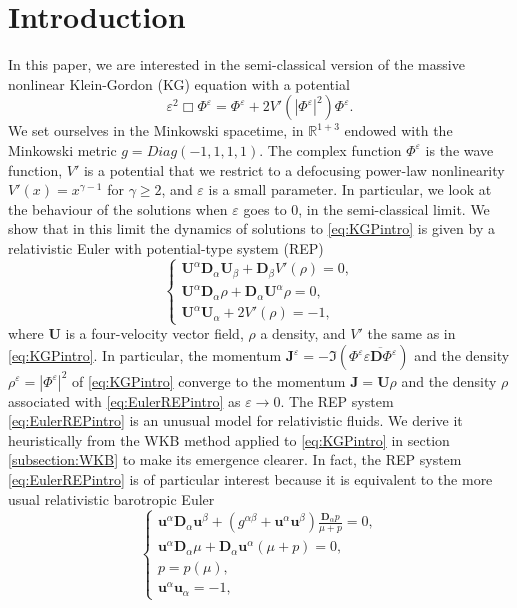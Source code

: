\documentclass[a4paper, 15pt]{article}
\numberwithin{equation}{section}
\begin{document}
\section{Introduction} 
\label{section:Intro}
In this paper, we are interested in the semi-classical version of the massive nonlinear Klein-Gordon (KG) equation with a potential
\begin{equation}
\label{eq:KGPintro}	\varepsilon^2\Box\Phi^\varepsilon=\Phi^\varepsilon+2V'(|\Phi^\varepsilon|^2)\Phi^\varepsilon.
\end{equation}
We set ourselves in the Minkowski spacetime, in $\mathbb{R}^{1+3}$ endowed with the Minkowski metric $g=Diag(-1,1,1,1)$. The complex function $\Phi^\varepsilon$ is the wave function, $V'$ is a potential that we restrict to a defocusing power-law nonlinearity $V'(x)=x^{\gamma-1}$ for $\gamma\geq2$, and $\varepsilon$ is a small parameter. In particular, we look at the behaviour of the solutions when $\varepsilon$ goes to 0, in the semi-classical limit. We show that in this limit the dynamics of solutions to \eqref{eq:KGPintro} is given by a relativistic Euler with potential-type system (REP)
\begin{equation}
\label{eq:EulerREPintro}
\begin{cases}
 \textbf{U}^\alpha\textbf{D}_\alpha \textbf{U}_\beta+\textbf{D}_\beta V'(\rho)=0,\\
\textbf{U}^\alpha\textbf{D}_\alpha \rho+\textbf{D}_\alpha \textbf{U}^\alpha\rho=0,\\
\textbf{U}^\alpha \textbf{U}_\alpha+2V'(\rho)=-1,
\end{cases}
\end{equation}
where $\textbf{U}$ is a four-velocity vector field, $\rho$ a density, and $V'$ the same as in \eqref{eq:KGPintro}. In particular, the momentum $\textbf{J}^\varepsilon=-\Im(\Phi^\varepsilon\overline{\varepsilon \textbf{D}\Phi^\varepsilon})$ and the density $\rho^\varepsilon=|\Phi^\varepsilon|^2$ of \eqref{eq:KGPintro} converge to the momentum $\textbf{J}=\textbf{U}\rho$ and the density $\rho$ associated with \eqref{eq:EulerREPintro} as $\varepsilon\to0$. The REP system \eqref{eq:EulerREPintro} is an unusual model for relativistic fluids. We derive it heuristically from the WKB method applied to \eqref{eq:KGPintro} in section \ref{subsection:WKB} to make its emergence clearer. In fact, the REP system \eqref{eq:EulerREPintro} is of particular interest because it is equivalent to the more usual relativistic barotropic Euler 
\begin{equation}
    \begin{cases}
    \label{eq:relatEulintro}
        \textbf{u}^\alpha\textbf{D}_\alpha \textbf{u}^\beta+(g^{\alpha\beta}+\textbf{u}^\alpha \textbf{u}^\beta)\frac{\textbf{D}_\alpha p}{\mu+p}=0,\\
        \textbf{u}^\alpha\textbf{D}_\alpha\mu+\textbf{D}_\alpha \textbf{u}^\alpha(\mu+p)=0,\\
        p=p(\mu),\\
        \textbf{u}^\alpha \textbf{u}_\alpha=-1,
    \end{cases}
\end{equation}
\end{document}
